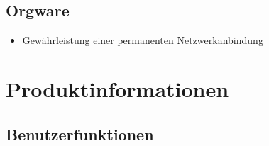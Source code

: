 \documentclass[a4paper,oneside]{scrreprt}
\begin{document}
\section{Orgware}

\begin{itemize}
\item Gewährleistung einer permanenten Netzwerkanbindung
\end{itemize}

\chapter{Produktinformationen}

\section{Benutzerfunktionen}
\end{document}
